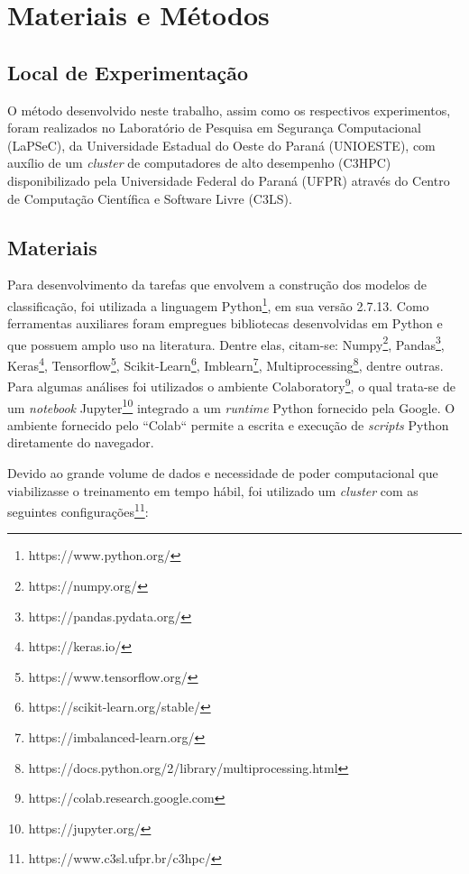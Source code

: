 \chapter{Materiais e Métodos} %
\label{Cap:modeloEspacos}

\section{Local de Experimentação}
\label{local-experimentacao}

O método desenvolvido neste trabalho, assim como os respectivos experimentos, foram  realizados no Laboratório de Pesquisa em Segurança Computacional (LaPSeC), da Universidade Estadual do Oeste do Paraná (UNIOESTE), com auxílio de um \textit{cluster} de computadores de alto desempenho (C3HPC) disponibilizado pela Universidade Federal do Paraná (UFPR) através do Centro de Computação Científica e Software Livre (C3LS).

\section{Materiais}
\label{Sec:subsecoesEspacos}

Para desenvolvimento da tarefas que envolvem a construção dos modelos de classificação, foi utilizada a linguagem Python\footnote{https://www.python.org/}, em sua versão 2.7.13. Como ferramentas auxiliares foram empregues bibliotecas desenvolvidas em Python e que possuem amplo uso na literatura. Dentre elas, citam-se: Numpy\footnote{https://numpy.org/}, Pandas\footnote{https://pandas.pydata.org/}, Keras\footnote{https://keras.io/}, Tensorflow\footnote{https://www.tensorflow.org/}, Scikit-Learn\footnote{https://scikit-learn.org/stable/}, Imblearn\footnote{https://imbalanced-learn.org/}, Multiprocessing\footnote{https://docs.python.org/2/library/multiprocessing.html}, dentre outras. Para algumas análises foi utilizados o ambiente Colaboratory\footnote{https://colab.research.google.com}, o qual trata-se de um \textit{notebook} Jupyter\footnote{https://jupyter.org/} integrado a um \textit{runtime} Python fornecido pela Google. O ambiente fornecido pelo ``Colab`` permite a escrita e execução de \textit{scripts} Python diretamente do navegador.

Devido ao grande volume de dados e necessidade de poder computacional que viabilizasse o treinamento em tempo hábil, foi utilizado um \textit{cluster} com as seguintes configurações\footnote{https://www.c3sl.ufpr.br/c3hpc/}:

